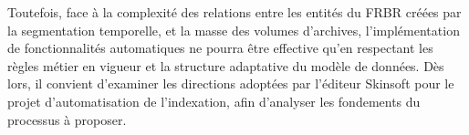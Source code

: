 Toutefois, face à la complexité des relations entre les entités du \gls{FRBR} créées par la segmentation temporelle, et la masse des volumes d'archives, l'implémentation de fonctionnalités automatiques ne pourra être effective qu'en respectant les règles métier en vigueur et la structure adaptative du modèle de données. Dès lors, il convient d’examiner les directions adoptées par l’éditeur Skinsoft pour le projet d'automatisation de l'indexation, afin d'analyser les fondements du processus à proposer. 

